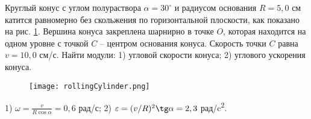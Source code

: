 \begin{ex} %
Круглый конус с углом полураствора $\alpha = 30^{\circ}$ и радиусом основания $R = 5,0$ см катится равномерно без скольжения по горизонтальной плоскости, как показано на рис. \ref{rollingCylinder}. Вершина конуса закреплена шарнирно в точке $O$, которая находится на одном уровне с точкой $C$ -- центром основания конуса. Скорость точки $C$ равна $v = 10,0$ см/с. Найти модули: 1) угловой скорости конуса; 2) углового ускорения конуса.

\begin{figure}[h]
\centering
\texttt{[image: rollingCylinder.png]}
\caption{}
\label{rollingCylinder}
\end{figure}

\begin{ans}
1) $\omega = \frac{v}{R \cos \alpha} = 0,6$ рад/с; 2) $\varepsilon = (v/R)^2 \tg \alpha = 2,3$ рад/c\textsuperscript{2}.
\end{ans}
\end{ex}

\clearpage